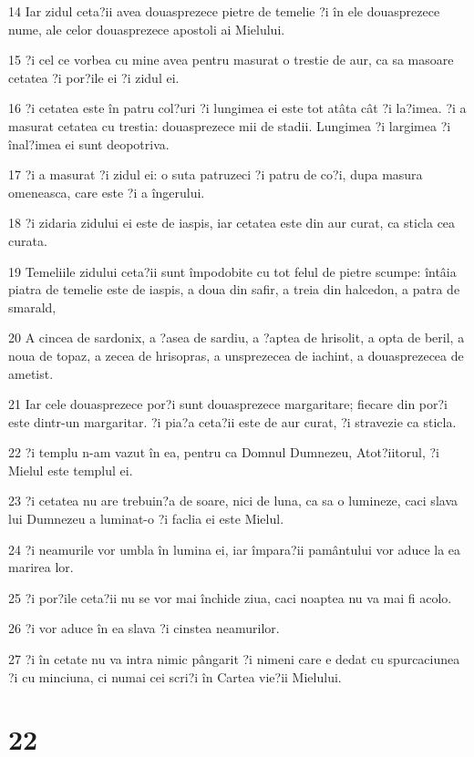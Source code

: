\par 14 Iar zidul ceta?ii avea douasprezece pietre de temelie ?i în ele douasprezece nume, ale celor douasprezece apostoli ai Mielului.
\par 15 ?i cel ce vorbea cu mine avea pentru masurat o trestie de aur, ca sa masoare cetatea ?i por?ile ei ?i zidul ei.
\par 16 ?i cetatea este în patru col?uri ?i lungimea ei este tot atâta cât ?i la?imea. ?i a masurat cetatea cu trestia: douasprezece mii de stadii. Lungimea ?i largimea ?i înal?imea ei sunt deopotriva.
\par 17 ?i a masurat ?i zidul ei: o suta patruzeci ?i patru de co?i, dupa masura omeneasca, care este ?i a îngerului.
\par 18 ?i zidaria zidului ei este de iaspis, iar cetatea este din aur curat, ca sticla cea curata.
\par 19 Temeliile zidului ceta?ii sunt împodobite cu tot felul de pietre scumpe: întâia piatra de temelie este de iaspis, a doua din safir, a treia din halcedon, a patra de smarald,
\par 20 A cincea de sardonix, a ?asea de sardiu, a ?aptea de hrisolit, a opta de beril, a noua de topaz, a zecea de hrisopras, a unsprezecea de iachint, a douasprezecea de ametist.
\par 21 Iar cele douasprezece por?i sunt douasprezece margaritare; fiecare din por?i este dintr-un margaritar. ?i pia?a ceta?ii este de aur curat, ?i stravezie ca sticla.
\par 22 ?i templu n-am vazut în ea, pentru ca Domnul Dumnezeu, Atot?iitorul, ?i Mielul este templul ei.
\par 23 ?i cetatea nu are trebuin?a de soare, nici de luna, ca sa o lumineze, caci slava lui Dumnezeu a luminat-o ?i faclia ei este Mielul.
\par 24 ?i neamurile vor umbla în lumina ei, iar împara?ii pamântului vor aduce la ea marirea lor.
\par 25 ?i por?ile ceta?ii nu se vor mai închide ziua, caci noaptea nu va mai fi acolo.
\par 26 ?i vor aduce în ea slava ?i cinstea neamurilor.
\par 27 ?i în cetate nu va intra nimic pângarit ?i nimeni care e dedat cu spurcaciunea ?i cu minciuna, ci numai cei scri?i în Cartea vie?ii Mielului.

\chapter{22}

